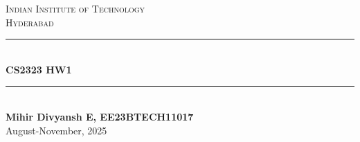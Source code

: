\begin{titlepage}

\newcommand{\HRule}{\rule{\linewidth}{0.5mm}} %

\center %
 

\textsc{\LARGE Indian Institute of Technology }\\[0.3cm] 
\textsc{\Large Hyderabad }\\[0.3cm]


\HRule \\[0.4cm]
{ \huge \bfseries CS2323 HW1}\\[0.03cm] %
\HRule \\[0.7cm]

 

\textbf{Mihir Divyansh E, EE23BTECH11017} \\[0.5cm]




{\large August-November, 2025}\\[1cm] %


 

\vfill %

\end{titlepage}

